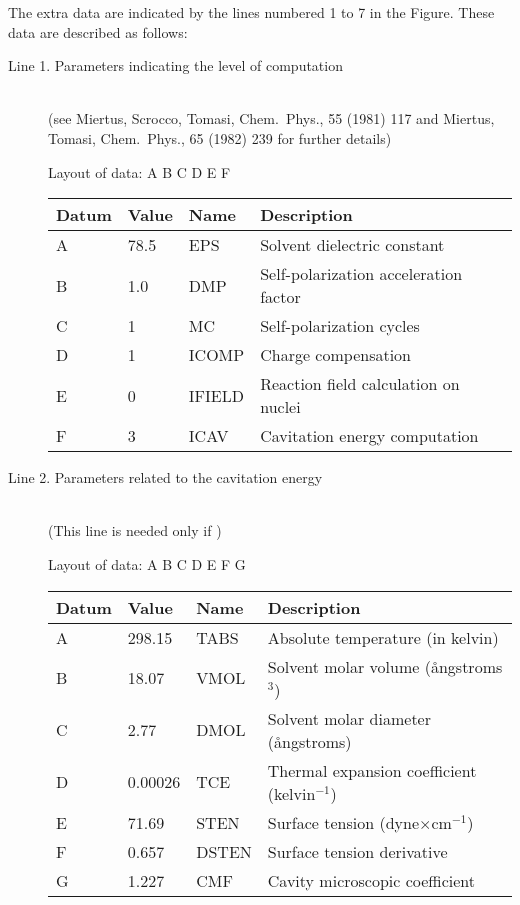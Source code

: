 The extra data are indicated by the lines numbered 1 to 7 in the Figure.  These
data are described as follows:
\begin{description}
\item[Line 1. Parameters indicating the level of computation]~\\
(see Miertus, Scrocco, Tomasi, Chem.\ Phys., 55 (1981) 117 and Miertus, Tomasi,
Chem.\ Phys., 65 (1982) 239 for further details)

Layout of data:  A B C D E F

\begin{center}
\begin{tabular}{llll}  \hline
 Datum & Value & Name   &  Description  \\ \hline
    A  & 78.5  & EPS    & Solvent dielectric constant          \\
    B  & 1.0   & DMP    & Self-polarization acceleration factor\\
    C  & 1     & MC     & Self-polarization cycles             \\
    D  & 1     & ICOMP  & Charge compensation                  \\
    E  & 0     & IFIELD & Reaction field calculation on nuclei \\
    F  & 3     & ICAV   & Cavitation energy computation        \\  \hline 
\end{tabular}
\end{center}

\item[Line 2. Parameters related to the cavitation energy]~\\
(This line is needed only if )

Layout of data: A B C D E F G                                                      

\begin{center}
\begin{tabular}{llll}  \hline
 Datum & Value & Name &  Description  \\  \hline
  A   & 298.15 & TABS &  Absolute temperature (in kelvin) \\
  B   &  18.07 & VMOL &  Solvent molar volume (\aa ngstroms$^3$) \\  
  C   &   2.77 & DMOL &  Solvent molar diameter (\aa ngstroms) \\
  D   & 0.00026 & TCE &  Thermal expansion coefficient (kelvin$^{-1}$) \\ 
  E   & 71.69  & STEN &  Surface tension (dyne$\times$cm$^{-1}$) \\
  F   & 0.657  & DSTEN &  Surface tension derivative \\
  G   & 1.227  & CMF  &  Cavity microscopic coefficient \\ \hline
\end{tabular}
\end{center}


\end{description}
